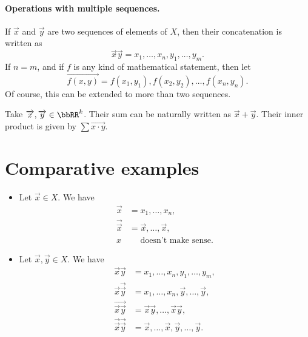 \documentclass[a4paper, 8pt]{article}
\begin{document}
\begin{multicols}{2}
\paragraph{Operations with multiple sequences.} If $\overrightarrow{x}$ and $\overrightarrow{y}$ are two sequences of elements of $X$, then their concatenation is written as
\[ \overrightarrow{x} \overrightarrow{y} = x_1, \ldots, x_n, y_1, \ldots, y_m . \]
If $n = m$, and if $f$ is any kind of mathematical statement, then let
\[ \overrightarrow{f (x, y)} = f (x_1, y_1), f (x_2, y_2), \ldots, f (x_n, y_n) . \]
Of course, this can be extended to more than two sequences.

\begin{example*}
	Take $\overrightarrow{x}, \overrightarrow{y} \in \bbRR^k$. Their sum can be naturally written as $\overrightarrow{x} + \overrightarrow{y}$. Their inner product is given by $\sum \overrightarrow{x \cdot y}$.
\end{example*}

\section{Comparative examples}

\begin{itemize}

	\item Let $\overrightarrow{x} \in X$. We have
		\begin{align*}
			\overrightarrow{x} &= x_1, \ldots, x_n , \\
			\overrightarrow{\overrightarrow{x}} &= \overrightarrow{x}, \ldots, \overrightarrow{x} , \\
			x &\phantom{=} \text{doesn't make sense} .
		\end{align*}

	\item Let $\overrightarrow{x}, \overrightarrow{y} \in X$. We have
		\begin{align*}
			\overrightarrow{x} \overrightarrow{y} &= x_1, \ldots, x_n, y_1, \ldots, y_m , \\
			\overrightarrow{x} \overrightarrow{\overrightarrow{y}} &= x_1, \ldots, x_n, \overrightarrow{y}, \ldots, \overrightarrow{y} , \\
			\overrightarrow{\overrightarrow{x} \overrightarrow{y}} &= \overrightarrow{x} \overrightarrow{y}, \ldots, \overrightarrow{x} \overrightarrow{y} , \\
			\overrightarrow{\overrightarrow{x}} \overrightarrow{\overrightarrow{y}} &= \overrightarrow{x}, \ldots, \overrightarrow{x}, \overrightarrow{y}, \ldots, \overrightarrow{y} .	
		\end{align*}


\end{itemize}
\end{multicols}
\end{document}
